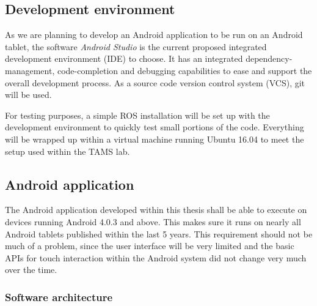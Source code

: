 \documentclass[a4paper]{article}
\begin{document}
\subsection{Development environment}

As we are planning to develop an Android application to be run on an Android tablet, the software \textit{Android Studio} is the current proposed integrated development environment (IDE) to choose. It has an integrated dependency-management, code-completion and debugging capabilities to ease and support the overall development process. As a source code version control system (VCS), git will be used.

For testing purposes, a simple ROS installation will be set up with the development environment to quickly test small portions of the code. Everything will be wrapped up within a virtual machine running Ubuntu 16.04 to meet the setup used within the TAMS lab.

\subsection{Android application}

The Android application developed within this thesis shall be able to execute on devices running Android 4.0.3 and above. This makes sure it runs on nearly all Android tablets published within the last 5 years. This requirement should not be much of a problem, since the user interface will be very limited and the basic APIs for touch interaction within the Android system did not change very much over the time. 

\subsubsection{Software architecture}
\end{document}
